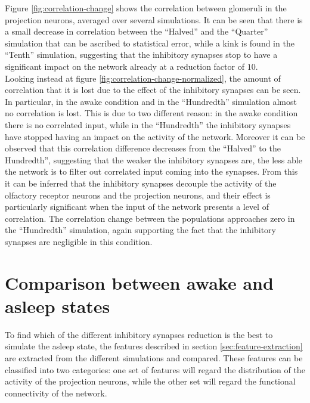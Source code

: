 Figure \ref{fig:correlation-change} shows the correlation between glomeruli in the projection neurons, averaged over several simulations.
It can be seen that there is a small decrease in correlation between the ``Halved'' and the ``Quarter'' simulation that can be ascribed to statistical error, while a kink is found in the ``Tenth'' simulation, suggesting that the inhibitory synapses stop to have a significant impact on the network already at a reduction factor of $10$.\\
Looking instead at figure \ref{fig:correlation-change-normalized}, the amount of correlation that it is lost due to the effect of the inhibitory synapses can be seen.
In particular, in the awake condition and in the ``Hundredth'' simulation almost no correlation is lost.
This is due to two different reason: in the awake condition there is no correlated input, while in the ``Hundredth'' the inhibitory synapses have stopped having an impact on the activity of the network.
Moreover it can be observed that this correlation difference decreases from the ``Halved'' to the Hundredth'', suggesting that the weaker the inhibitory synapses are, the less able the network is to filter out correlated input coming into the synapses.
From this it can be inferred that the inhibitory synapses decouple the activity of the olfactory receptor neurons and the projection neurons, and their effect is particularly significant when the input of the network presents a level of correlation.
The correlation change between the populations approaches zero in the ``Hundredth'' simulation, again supporting the fact that the inhibitory synapses are negligible in this condition.

\section{Comparison between awake and asleep states}
To find which of the different inhibitory synapses reduction is the best to simulate the asleep state, the features described in section \ref{sec:feature-extraction} are extracted from the different simulations and compared.
These features can be classified into two categories: one set of features will regard the distribution of the activity of the projection neurons, while the other set will regard the functional connectivity of the network.\\

